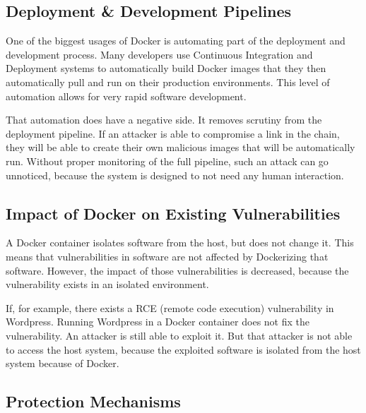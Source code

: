 \subsection{Deployment \& Development Pipelines}
One of the biggest usages of Docker is automating part of the deployment and development process. Many developers use Continuous Integration and Deployment systems to automatically build Docker images that they then automatically pull and run on their production environments. This level of automation allows for very rapid software development.

That automation does have a negative side. It removes scrutiny from the deployment pipeline. If an attacker is able to compromise a link in the chain, they will be able to create their own malicious images that will be automatically run. Without proper monitoring of the full pipeline, such an attack can go unnoticed, because the system is designed to not need any human interaction.

\subsection{Impact of Docker on Existing Vulnerabilities}
A Docker container isolates software from the host, but does not change it. This means that vulnerabilities in software are not affected by Dockerizing that software. However, the impact of those vulnerabilities is decreased, because the vulnerability exists in an isolated environment.

If, for example, there exists a RCE (remote code execution) vulnerability in Wordpress. Running Wordpress in a Docker container does not fix the vulnerability. An attacker is still able to exploit it. But that attacker is not able to access the host system, because the exploited software is isolated from the host system because of Docker.

\subsection{Protection Mechanisms}
